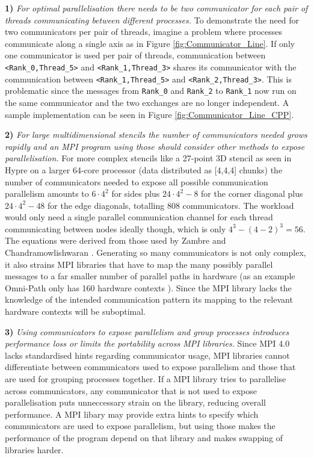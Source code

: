 \documentclass[sigconf]{acmart}
\begin{document}
\textbf{1)} \textit{For optimal parallelisation there needs to be two communicator for each pair of threads communicating between different processes.}
To demonstrate the need for two communicators per pair of threads, imagine a problem where processes communicate along a single axis as in Figure \ref{fig:Communicator_Line}.
If only one communicator is used per pair of threads, communication between \verb|<Rank_0,Thread_5>| and \verb|<Rank_1,Thread_3>| shares its communicator with the communication between \verb|<Rank_1,Thread_5>| and \verb|<Rank_2,Thread_3>|.
This is problematic since the messages from \verb|Rank_0| and \verb|Rank_2| to \verb|Rank_1| now run on the same communicator and the two exchanges are no longer independent.
A sample implementation can be seen in Figure \ref{fig:Communicator_Line_CPP}.

\textbf{2)} \textit{For large multidimensional stencils the number of communicators needed grows rapidly and an MPI program using those should consider other methods to expose parallelisation.}
For more complex stencils like a 27-point 3D stencil as seen in Hypre\cite{hypre2020} on a larger 64-core processor (data distributed as [4,4,4] chunks) the number of communicators needed to expose all possible communication parallelism amounts to $6 \cdot 4^2$ for sides plus $24 \cdot 4^2 - 8$ for the corner diagonal plus $24 \cdot 4^2 - 48$ for the edge diagonals, totalling $808$ communicators.
The workload would only need a single parallel communication channel for each thread communicating between nodes ideally though, which is only $4^3 - (4-2)^3 = 56$.
The equations were derived from those used by Zambre and Chandramowlishwaran \cite{zambreLessonsLearned2022}.
Generating so many communicators is not only complex, it also strains MPI libraries that have to map the many possibly parallel messages to a far smaller number of parallel paths in hardware (as an example Omni-Path only has 160 hardware contexts \cite{intelOmniPath}).
Since the MPI library lacks the knowledge of the intended communication pattern its mapping to the relevant hardware contexts will be suboptimal.

\textbf{3)} \textit{Using communicators to expose parallelism and group processes introduces performance loss or limits the portability across MPI libraries.}
Since MPI 4.0 lacks standardised hints regarding communicator usage, MPI libraries cannot differentiate between communicators used to expose parallelism and those that are used for grouping processes together.
If a MPI library tries to parallelise across communicators, any communicator that is not used to expose parallelisation puts unneccessary strain on the library, reducing overall performance.
A MPI libary may provide extra hints to specify which communicators are used to expose parallelism, but using those makes the performance of the program depend on that library and makes swapping of libraries harder.
\end{document}
